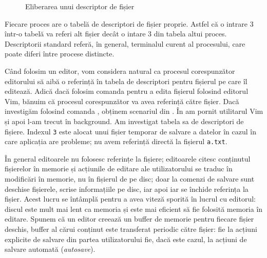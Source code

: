 \begin{figure}[!htbp]
	\centering
	\def\svgwidth{0.8\textwidth}
	
	\caption{Eliberarea unui descriptor de fișier}
	\label{fig:process-free-fd}
\end{figure}

Fiecare proces are o tabelă de descriptori de fișier proprie. Astfel că o
intrare 3 într-o tabelă va referi alt fișier decât o intare 3 din tabela altui
proces. Descriptorii standard referă, în general, terminalul curent al
procesului, care poate diferi între procese distincte.

Când folosim un editor, vom considera natural ca procesul corespunzător
editorului să aibă o referință în tabela de descriptori pentru fișierul pe care
îl editează. Adică dacă folosim comanda  pentru a edita fișierul
 folosind editorul Vim, bănuim că procesul corespunzător va avea
referință către fișier. Dacă investigăm folosind comanda , obținem scenariul
din .
În  am pornit utilitarul Vim și apoi l-am trecut în background. Am investigat tabela sa de descriptori de fișiere. Indexul \texttt{3} este alocat unui fișier temporar de salvare a datelor în cazul în care aplicația are probleme; nu avem referință directă la fișierul \texttt{a.txt}.


În general editoarele
nu folosesc referințe la fișiere; editoarele citesc conținutul fișierelor în
memorie și acțiunile de editare ale utilizatorului se traduc în modificări în
memorie, nu în fișierul de pe disc; doar la comenzi de salvare sunt deschise
fișierele, scrise informațiile pe disc, iar apoi iar se închide referința la
fișier. Acest lucru se întâmplă pentru a avea viteză sporită în lucrul cu
editorul: discul este mult mai lent ca memoria și este mai eficient să fie
folosită memoria în editare. Spunem că un editor creează un buffer de memorie
pentru fiecare fișier deschis, buffer al cărui conținut este transferat periodic
către fișier: fie la acțiuni explicite de salvare din partea utilizatorului fie,
dacă este cazul, la acțiuni de salvare automată (\textit{autosave}).

